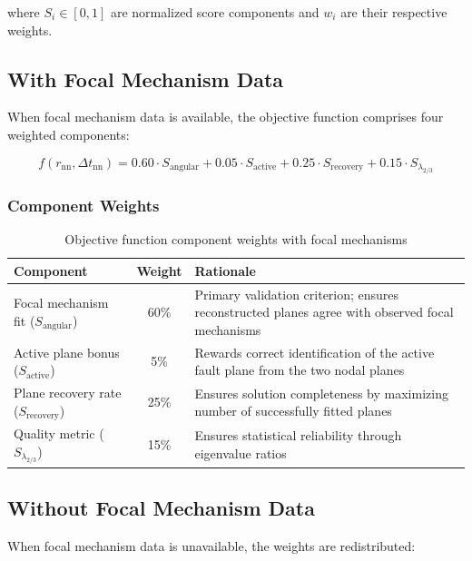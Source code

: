 \documentclass[11pt,a4paper]{article}
\begin{document}
where $S_i \in [0, 1]$ are normalized score components and $w_i$ are their respective weights.

\subsection{With Focal Mechanism Data}

When focal mechanism data is available, the objective function comprises four weighted components:

\begin{equation}
\label{eq:objective_focal}
f(r_{\text{nn}}, \Delta t_{\text{nn}}) = 0.60 \cdot S_{\text{angular}} + 0.05 \cdot S_{\text{active}} + 0.25 \cdot S_{\text{recovery}} + 0.15 \cdot S_{\lambda_{2/3}}
\end{equation}

\subsubsection{Component Weights}

\begin{table}[h]
\centering
\caption{Objective function component weights with focal mechanisms}
\label{tab:weights_focal}
\begin{tabular}{lcp{7cm}}
\toprule
\textbf{Component} & \textbf{Weight} & \textbf{Rationale} \\
\midrule
Focal mechanism fit ($S_{\text{angular}}$) & 60\% & Primary validation criterion; ensures reconstructed planes agree with observed focal mechanisms \\
Active plane bonus ($S_{\text{active}}$) & 5\% & Rewards correct identification of the active fault plane from the two nodal planes \\
Plane recovery rate ($S_{\text{recovery}}$) & 25\% & Ensures solution completeness by maximizing number of successfully fitted planes \\
Quality metric ($S_{\lambda_{2/3}}$) & 15\% & Ensures statistical reliability through eigenvalue ratios \\
\bottomrule
\end{tabular}
\end{table}

\subsection{Without Focal Mechanism Data}

When focal mechanism data is unavailable, the weights are redistributed:
\end{document}
